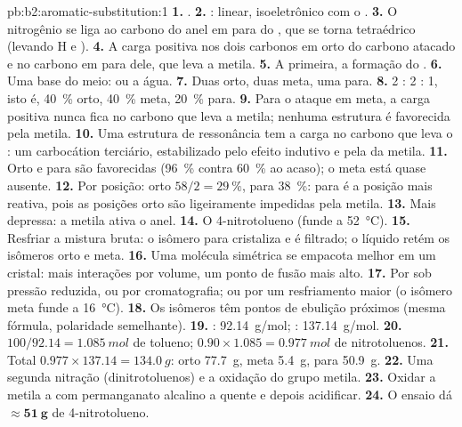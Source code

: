\begin{solution}{pb:b2:aromatic-substitution:1}
\textbf{1.} .
\textbf{2.} : linear, isoeletrônico com o .
\textbf{3.} O nitrogênio se liga ao carbono do anel em para do , que se
torna tetraédrico (levando H e ).
\textbf{4.} A carga positiva nos dois carbonos em orto do carbono atacado e no
carbono em para dele, que leva a metila.
\textbf{5.} A primeira, a formação do .
\textbf{6.} Uma base do meio:  ou a água.
\textbf{7.} Duas orto, duas meta, uma para.
\textbf{8.} 2 : 2 : 1, isto é, 40~\% orto, 40~\% meta, 20~\% para.
\textbf{9.} Para o ataque em meta, a carga positiva nunca fica no carbono que
leva a metila; nenhuma estrutura é favorecida pela metila.
\textbf{10.} Uma estrutura de ressonância tem a carga no carbono que leva o
: um carbocátion terciário, estabilizado pelo efeito indutivo e pela
 da metila.
\textbf{11.} Orto e para são favorecidas (96~\% contra 60~\% ao acaso); o meta
está quase ausente.
\textbf{12.} Por posição: orto $58/2 = 29~\%$, para 38~\%: para é a posição mais
reativa, pois as posições orto são ligeiramente impedidas pela metila.
\textbf{13.} Mais depressa: a metila ativa o anel.
\textbf{14.} O 4-nitrotolueno (funde a \qty{52}{\degreeCelsius}).
\textbf{15.} Resfriar a mistura bruta: o isômero para cristaliza e é filtrado; o
líquido retém os isômeros orto e meta.
\textbf{16.} Uma molécula simétrica se empacota melhor em um cristal: mais
interações por volume, um ponto de fusão mais alto.
\textbf{17.} Por  sob pressão reduzida, ou por
cromatografia; ou por um resfriamento maior (o isômero meta funde a
\qty{16}{\degreeCelsius}).
\textbf{18.} Os isômeros têm pontos de ebulição próximos (mesma fórmula,
polaridade semelhante).
\textbf{19.} : \qty{92.14}{g/mol}; : \qty{137.14}{g/mol}.
\textbf{20.} $100/92.14 = \qty{1.085}{mol}$ de tolueno; $0.90 \times 1.085 = \qty{0.977}{mol}$ de
nitrotoluenos.
\textbf{21.} Total $0.977 \times 137.14 = \qty{134.0}{g}$: orto \qty{77.7}{g}, meta
\qty{5.4}{g}, para \qty{50.9}{g}.
\textbf{22.} Uma segunda nitração (dinitrotoluenos) e a oxidação do grupo metila.
\textbf{23.} Oxidar a metila a  com permanganato alcalino a quente e
depois acidificar.
\textbf{24.} O ensaio dá $\boldsymbol{\approx \qty{51}{g}}$ de 4-nitrotolueno.
\end{solution}
